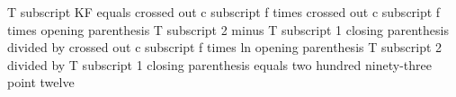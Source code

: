 T subscript KF equals crossed out c subscript f times crossed out c subscript f times opening parenthesis T subscript 2 minus T subscript 1 closing parenthesis divided by crossed out c subscript f times ln opening parenthesis T subscript 2 divided by T subscript 1 closing parenthesis equals two hundred ninety-three point twelve